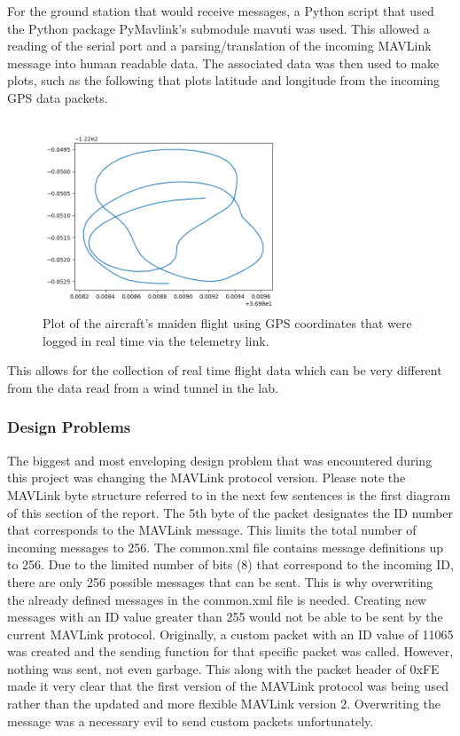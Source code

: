 \documentclass[12pt,journal,compsoc]{IEEEtran}
\begin{document}
For the ground station that would receive messages, a Python script that used the Python package PyMavlink's submodule mavuti was used. This allowed a reading of the serial port and a parsing/translation of the incoming MAVLink message into human readable data. The associated data was then used to make plots, such as the following that plots latitude and longitude from the incoming GPS data packets.
\begin{figure}[h!]
\hspace*{0cm}
\centering
\includegraphics[width=3in]{flight02-22-2019_maiden.png}
\caption{Plot of the aircraft's maiden flight using GPS coordinates that were logged in real time via the telemetry link.}
\label{maidenFlightPlot}
\end{figure}

This allows for the collection of real time flight data which can be very different from the data read from a wind tunnel in the lab. 

\subsubsection{Design Problems}
The biggest and most enveloping design problem that was encountered during this project was changing the MAVLink protocol version. Please note the MAVLink byte structure referred to in the next few sentences is the first diagram of this section of the report. The 5th byte of the packet designates the ID number that corresponds to the MAVLink message. This limits the total number of incoming messages to 256. The common.xml file contains message definitions up to 256. Due to the limited number of bits (8) that correspond to the incoming ID, there are only 256 possible messages that can be sent. This is why overwriting the already defined messages in the common.xml file is needed. Creating new messages with an ID value greater than 255 would not be able to be sent by the current MAVLink protocol. Originally, a custom packet with an ID value of 11065 was created and the sending function for that specific packet was called. However, nothing was sent, not even garbage. This along with the packet header of 0xFE made it very clear that the first version of the MAVLink protocol was being used rather than the updated and more flexible MAVLink version 2. Overwriting the message was a necessary evil to send custom packets unfortunately. 
\end{document}
